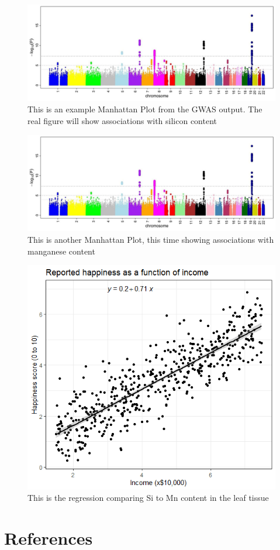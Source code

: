 \documentclass[12pt, letterpaper, ]{article}
\begin{document}
\begin{figure}[h]
        \includegraphics{images/Manhattan_Plot.png}
        \centering
        \caption{This is an example Manhattan Plot from the GWAS output. The real figure will show associations with silicon content}
        \label{Fig:si_peak_plot}
\end{figure}
\begin{figure}[h]
        \includegraphics{images/Manhattan_Plot.png}
        \centering
        \caption{This is another Manhattan Plot, this time showing associations with manganese content}
        \label{Fig:mn_peak_plot}
\end{figure}

\begin{figure}[h]
        \includegraphics{images/si_mn_regression.png}
        \centering
        \caption{This is the regression comparing Si to Mn content in the leaf tissue}
        \label{Fig:mn_si_regression}
\end{figure}

\clearpage

\section{References}
\printbibliography
\end{document}
